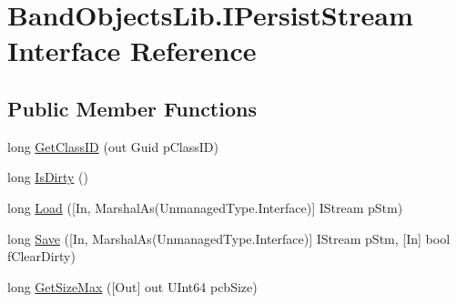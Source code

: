 \hypertarget{interface_band_objects_lib_1_1_i_persist_stream}{\section{Band\+Objects\+Lib.\+I\+Persist\+Stream Interface Reference}
\label{interface_band_objects_lib_1_1_i_persist_stream}
}
\subsection*{Public Member Functions}
\begin{DoxyCompactItemize}
\item 
long \hyperlink{interface_band_objects_lib_1_1_i_persist_stream_a3b3c8ccd2135dabc5d49b0c841bf7622}{Get\+Class\+I\+D} (out Guid p\+Class\+I\+D)
\item 
long \hyperlink{interface_band_objects_lib_1_1_i_persist_stream_acc07f9684d1403d33a85d133c85728d2}{Is\+Dirty} ()
\item 
long \hyperlink{interface_band_objects_lib_1_1_i_persist_stream_a0e2b4320f8dcbbe84140bc8db6e0e6b6}{Load} (\mbox{[}In, Marshal\+As(Unmanaged\+Type.\+Interface)\mbox{]} I\+Stream p\+Stm)
\item 
long \hyperlink{interface_band_objects_lib_1_1_i_persist_stream_a1b88024da7bbdf9deb43e3432c73a0bc}{Save} (\mbox{[}In, Marshal\+As(Unmanaged\+Type.\+Interface)\mbox{]} I\+Stream p\+Stm, \mbox{[}In\mbox{]} bool f\+Clear\+Dirty)
\item 
long \hyperlink{interface_band_objects_lib_1_1_i_persist_stream_acbe438820a71e6640ae2434ed99a5aa2}{Get\+Size\+Max} (\mbox{[}Out\mbox{]} out U\+Int64 pcb\+Size)
\end{DoxyCompactItemize}


